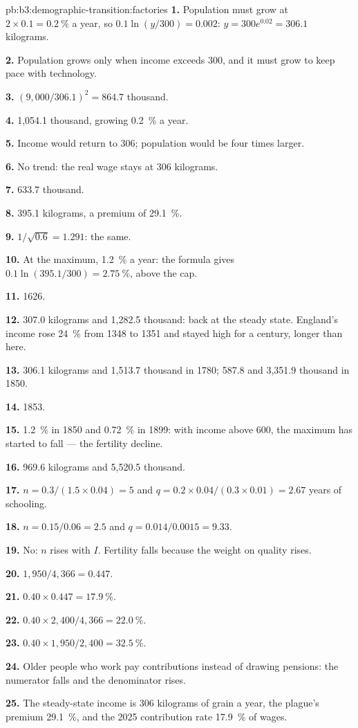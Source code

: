 \begin{solution}{pb:b3:demographic-transition:factories}
\textbf{1.} Population must grow at $2 \times 0.1 = 0.2~\%$ a year, so $0.1\ln(y/300) = 0.002$: $y = 300e^{0.02} = 306.1$ kilograms.

\textbf{2.} Population grows only when income exceeds 300, and it must grow to keep pace with technology.

\textbf{3.} $(9{,}000/306.1)^2 = 864.7$ thousand.

\textbf{4.} 1{,}054.1 thousand, growing 0.2~\% a year.

\textbf{5.} Income would return to 306; population would be four times larger.

\textbf{6.} No trend: the real wage stays at 306 kilograms.

\textbf{7.} 633.7 thousand.

\textbf{8.} 395.1 kilograms, a premium of 29.1~\%.

\textbf{9.} $1/\sqrt{0.6} = 1.291$: the same.

\textbf{10.} At the maximum, 1.2~\% a year: the formula gives $0.1\ln(395.1/300) = 2.75~\%$, above the cap.

\textbf{11.} 1626.

\textbf{12.} 307.0 kilograms and 1{,}282.5 thousand: back at the steady state. England's income rose 24~\% from 1348 to 1351 and
stayed high for a century, longer than here.

\textbf{13.} 306.1 kilograms and 1{,}513.7 thousand in 1780; 587.8 and 3{,}351.9 thousand in 1850.

\textbf{14.} 1853.

\textbf{15.} 1.2~\% in 1850 and 0.72~\% in 1899: with income above 600, the maximum has started to fall --- the
fertility decline.

\textbf{16.} 969.6 kilograms and 5{,}520.5 thousand.

\textbf{17.} $n = 0.3/(1.5 \times 0.04) = 5$ and $q = 0.2 \times 0.04/(0.3 \times 0.01) = 2.67$ years of schooling.

\textbf{18.} $n = 0.15/0.06 = 2.5$ and $q = 0.014/0.0015 = 9.33$.

\textbf{19.} No: $n$ rises with $I$. Fertility falls because the weight on quality rises.

\textbf{20.} $1{,}950/4{,}366 = 0.447$.

\textbf{21.} $0.40 \times 0.447 = 17.9~\%$.

\textbf{22.} $0.40 \times 2{,}400/4{,}366 = 22.0~\%$.

\textbf{23.} $0.40 \times 1{,}950/2{,}400 = 32.5~\%$.

\textbf{24.} Older people who work pay contributions instead of drawing pensions: the
numerator falls and the denominator rises.

\textbf{25.} The steady-state income is 306 kilograms of grain a year, the plague's premium 29.1~\%, and the 2025
contribution rate 17.9~\% of wages.
\end{solution}
